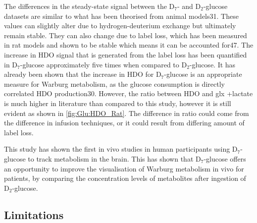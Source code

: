 \documentclass[class=article, crop=false]{standalone}
\begin{document}
The differences in the steady-state signal between the D$_7$- and D$_2$-glucose datasets are similar to what has been theorised from animal models31. These values can slightly alter due to hydrogen-deuterium exchange but ultimately remain stable. They can also change due to label loss, which has been measured in rat models and shown to be stable which means it can be accounted for47. The increase in HDO signal that is generated from the label loss has been quantified in D$_7$-glucose approximately five times when compared to D$_2$-glucose. It has already been shown that the increase in HDO for D$_7$-glucose is an appropriate measure for Warburg metabolism, as the glucose consumption is directly correlated HDO production30. However, the ratio between HDO and glx +lactate is much higher in literature than compared to this study, however it is still evident as shown in \ref{fig:Glu:HDO_Rat}. The difference in ratio could come from the difference in infusion techniques, or it could result from differing amount of label loss.


This study has shown the first in vivo studies in human participants using D$_7$-glucose to track metabolism in the brain. This has shown that D$_7$-glucose offers an opportunity to improve the visualisation of Warburg metabolism in vivo for patients, by comparing the concentration levels of metabolites after ingestion of D$_2$-glucose. 


\subsection{Limitations}
\end{document}
